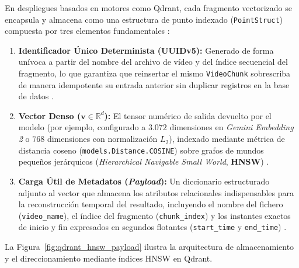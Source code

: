 En despliegues basados en motores como Qdrant, cada fragmento vectorizado se encapsula y almacena como una estructura de punto indexado (\texttt{PointStruct}) compuesta por tres elementos fundamentales \cite{gemini_emb2_docs}: %
\begin{enumerate}
    \item \textbf{Identificador Único Determinista (UUIDv5):} Generado de forma unívoca a partir del nombre del archivo de vídeo y del índice secuencial del fragmento, lo que garantiza que reinsertar el mismo \texttt{VideoChunk} sobrescriba de manera idempotente su entrada anterior sin duplicar registros en la base de datos \cite{gemini_emb2_docs}. %
    \item \textbf{Vector Denso ($\mathbf{v} \in \mathbb{R}^d$):} El tensor numérico de salida devuelto por el modelo (por ejemplo, configurado a $3.072$ dimensiones en \textit{Gemini Embedding 2} o $768$ dimensiones con normalización $L_2$), indexado mediante métrica de distancia coseno (\texttt{models.Distance.COSINE}) sobre grafos de mundos pequeños jerárquicos (\textit{Hierarchical Navigable Small World}, \textbf{HNSW}) \cite{malkov2020hnsw, gemini_emb2_docs}. %
    \item \textbf{Carga Útil de Metadatos (\textit{Payload}):} Un diccionario estructurado adjunto al vector que almacena los atributos relacionales indispensables para la reconstrucción temporal del resultado, incluyendo el nombre del fichero (\texttt{video\_name}), el índice del fragmento (\texttt{chunk\_index}) y los instantes exactos de inicio y fin expresados en segundos flotantes (\texttt{start\_time} y \texttt{end\_time}) \cite{gemini_emb2_docs}. %
\end{enumerate}

La Figura~\ref{fig:qdrant_hnsw_payload} ilustra la arquitectura de almacenamiento y el direccionamiento mediante índices HNSW en Qdrant. %

